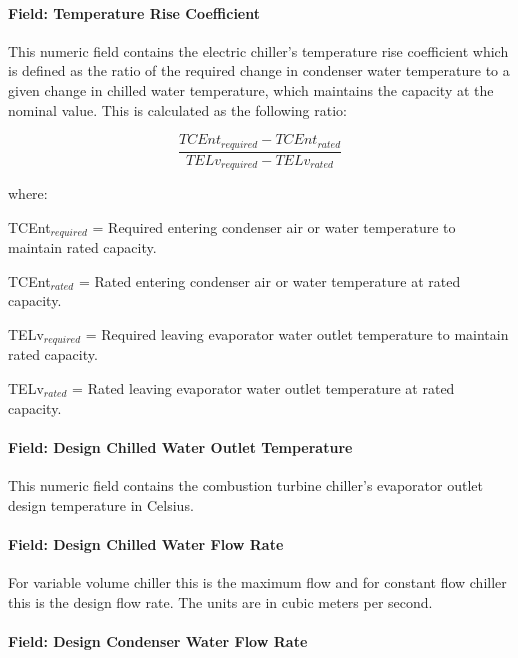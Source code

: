 \paragraph{Field: Temperature Rise Coefficient}\label{field-temperature-rise-coefficient-2}

This numeric field contains the electric chiller's temperature rise coefficient which is defined as the ratio of the required change in condenser water temperature to a given change in chilled water temperature, which maintains the capacity at the nominal value. This is calculated as the following ratio:

\begin{equation}
    \frac{{TCEn{t_{required}} - TCEn{t_{rated}}}}{{TEL{v_{required}} - TEL{v_{rated}}}}
\end{equation}

where:

TCEnt\(_{required}\) = Required entering condenser air or water temperature to maintain rated capacity.

TCEnt\(_{rated}\) = Rated entering condenser air or water temperature at rated capacity.

TELv\(_{required}\) = Required leaving evaporator water outlet temperature to maintain rated capacity.

TELv\(_{rated}\) = Rated leaving evaporator water outlet temperature at rated capacity.

\paragraph{Field: Design Chilled Water Outlet Temperature}\label{field-design-chilled-water-outlet-temperature-2}

This numeric field contains the combustion turbine chiller's evaporator outlet design temperature in Celsius.

\paragraph{Field: Design Chilled Water Flow Rate}\label{field-design-chilled-water-flow-rate-5}

For variable volume chiller this is the maximum flow and for constant flow chiller this is the design flow rate. The units are in cubic meters per second.

\paragraph{Field: Design Condenser Water Flow Rate}\label{field-design-condenser-water-flow-rate-4}

